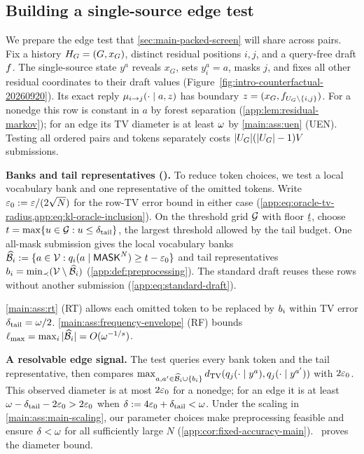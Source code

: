 {

\subsection{Building a single-source edge test}
\label{sec:main-algorithm-flow}

We prepare the edge test that \cref{sec:main-packed-screen} will share across pairs.
Fix a history $\History=(G,x_G)$, distinct residual positions $i,j$, and
a query-free draft $\DraftFiller$.
The single-source state $y^a$ reveals $x_G$, sets
$y_i^a=a$, masks $j$, and fixes all other residual coordinates to their draft
values (Figure~\ref{fig:intro-counterfactual-20260920}).
Its exact reply $\BoundaryRow{i}{j}{a}{z}$ has boundary
$z=(x_G,\DraftFiller_{\ResidualPositions\setminus\{i,j\}})$.
For a nonedge this row is constant in $a$ by forest separation
(\cref{app:lem:residual-markov});
for an edge its TV diameter is at least $\EdgeSignal$ by
\cref{main:ass:uen} (UEN).
Testing all ordered pairs and tokens separately costs
$|\ResidualPositions|(|\ResidualPositions|-1)\VocabSize$ submissions.

\textbf{Banks and tail representatives ().}
To reduce token choices, we test a local vocabulary bank and one
representative of the omitted tokens.
Write $\RowTVError:=\TargetTolerance/(2\sqrt N)$ for the row-TV error
bound in either case (\cref{app:eq:oracle-tv-radius,app:eq:kl-oracle-inclusion}).
On the threshold grid $\ThresholdGrid$ with floor $\ThresholdFloor$,
choose $\TailThreshold=\max\{u\in\ThresholdGrid:u\le\TailTolerance\}$,
the largest threshold allowed by the tail budget.
One all-mask submission gives the local vocabulary banks
$\TokenBank{i}:=\{a\in\Vocab:\OracleRowMass{\MASK^N}{i}{a}
\ge\TailThreshold-\RowTVError\}$ and tail representatives
$\TailRepresentative{i}=\min_{\TokenOrder}(\Vocab\setminus\TokenBank{i})$
(\cref{app:def:preprocessing}).
The standard draft reuses these rows without another submission
(\cref{app:eq:standard-draft}).

\cref{main:ass:rt} (RT) allows each omitted token to be replaced by $\TailRepresentative{i}$
within TV error $\TailTolerance=\EdgeSignal/2$.
\cref{main:ass:frequency-envelope} (RF) bounds
$\MaxBankSize=\max_i|\TokenBank{i}|=O(\EdgeSignal^{-1/\RankTailExponent})$.

\textbf{A resolvable edge signal.}
The test queries every bank token and the tail representative, then compares
$\max_{a,a'\in\TokenBank{i}\cup\{\TailRepresentative{i}\}}
\dTV(\OracleRow{y^a}{j},\OracleRow{y^{a'}}{j})$ with $2\RowTVError$.
This observed diameter is at most $2\RowTVError$ for a nonedge;
for an edge it is at least
$\EdgeSignal-\TailTolerance-2\RowTVError>2\RowTVError$
when $\ScreenResolution:=4\RowTVError+\TailTolerance<\EdgeSignal$.
Under the scaling in \cref{main:ass:main-scaling}, our parameter choices
make preprocessing feasible and ensure $\ScreenResolution<\EdgeSignal$
for all sufficiently large $N$ (\cref{app:cor:fixed-accuracy-main}).
\AppLowDegreeScreenRef\ proves the diameter bound.

}
